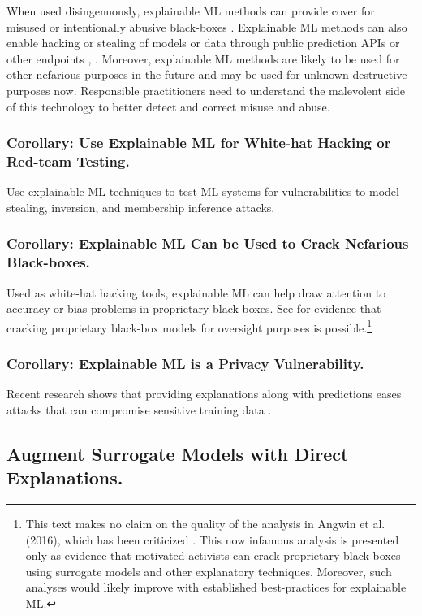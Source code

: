 \documentclass{article}
\begin{document}
When used disingenuously, explainable ML methods can provide cover for misused or intentionally abusive black-boxes \cite{fair_washing}. Explainable ML methods can also enable hacking or stealing of models or data through public prediction APIs or other endpoints \cite{membership_inference}, \cite{model_stealing}. Moreover, explainable ML methods are likely to be used for other nefarious purposes in the future and may be used for unknown destructive purposes now. Responsible practitioners need to understand the malevolent side of this technology to better detect and correct misuse and abuse. 

\subsubsection{Corollary: Use Explainable ML for White-hat Hacking or Red-team Testing.} Use explainable ML techniques to test ML systems for vulnerabilities to model stealing, inversion, and membership inference attacks. 

\subsubsection{Corollary: Explainable ML Can be Used to Crack Nefarious Black-boxes.} Used as white-hat hacking tools, explainable ML can help draw attention to accuracy or bias problems in proprietary black-boxes. See \citet{angwin16} for evidence that cracking proprietary black-box models for oversight purposes is possible.\footnote{This text makes no claim on the quality of the analysis in Angwin et al. (2016), which has been criticized \cite{flores2016false}. This now infamous analysis is presented only as evidence that motivated activists can crack proprietary black-boxes using surrogate models and other explanatory techniques. Moreover, such analyses would likely improve with established best-practices for explainable ML.} 

\subsubsection{Corollary: Explainable ML is a Privacy Vulnerability.} Recent research shows that providing explanations along with predictions eases attacks that can compromise sensitive training data \cite{shokri2019privacy}. 

\subsection{Augment Surrogate Models with Direct Explanations.}
\end{document}
